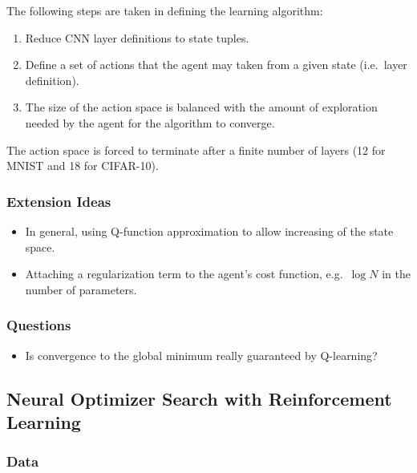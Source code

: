 \documentclass[a4paper, 12pt]{article}
\begin{document}
The following steps are taken in defining the learning algorithm:

\begin{enumerate}
        \item Reduce CNN layer definitions to state tuples.

        \item Define a set of actions that the agent may taken from a given
                state (i.e.\ layer definition).

        \item The size of the action space is balanced with the amount of
                exploration needed by the agent for the algorithm to converge.
\end{enumerate}

The action space is forced to terminate after a finite number of layers (12 for
MNIST and 18 for CIFAR-10).

\subsubsection{Extension Ideas}

\begin{itemize}
        \item In general, using Q-function approximation to allow increasing of
                the state space.

        \item Attaching a regularization term to the agent's cost function,
                e.g.\ $\log{N}$ in the number of parameters.
\end{itemize}

\subsubsection{Questions}

\begin{itemize}
        \item Is convergence to the global minimum really guaranteed by
                Q-learning?
\end{itemize}


\subsection{Neural Optimizer Search with Reinforcement
            Learning~\citet{neural-optimizer-search-46114}}

\subsubsection{Data}
\end{document}
